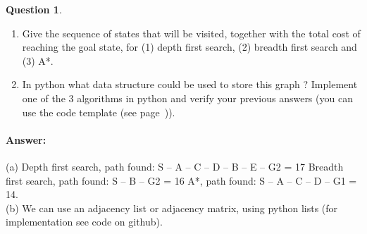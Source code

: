 \documentclass[11pt,a4paper]{article}
\theoremstyle{definition}%
\newtheorem{Q}{Question}[] %
\newcommand{\reponse}[1]{%
\ifthenelse {\boolean{corrige}} {\paragraph{Answer:} \color{darkblue}   #1\color{black}} {}
}
\begin{document}
\begin{Q}
\begin{enumerate}
    \item Give the sequence of states that will be visited, together with the total cost 
        of reaching the goal state, for (1) depth first search, (2) breadth first search 
        and (3) A*.
    \item In python what data structure could be used to store this graph ? 
        Implement one of the 3 algorithms in python and verify your previous answers 
        (you can use the code template (see page~\pageref{source})).
\end{enumerate}

\reponse{
    (a) Depth first search, path found: S – A – C – D – B – E – G2 = 17
Breadth first search, path found: S – B – G2 = 16
A*, path found: S – A – C – D – G1 = 14.\\
(b) We can use an adjacency list or adjacency matrix, using python lists (for implementation see
code on github).
}
\end{Q}
\end{document}
